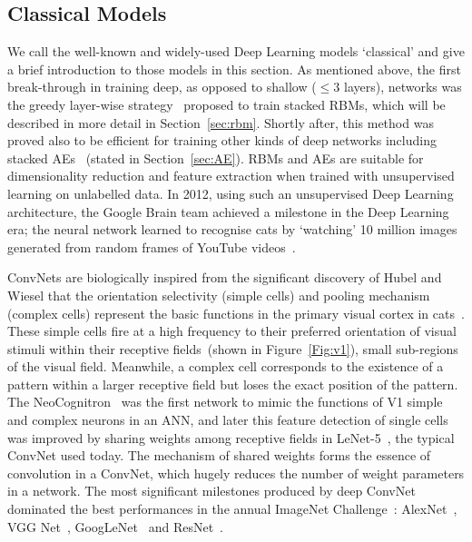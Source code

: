\subsection{Classical Models}
We call the well-known and widely-used Deep Learning models `classical' and give a brief introduction to those models in this section. 
As mentioned above, the first break-through in training deep, as opposed to shallow ($\le 3$ layers), networks was the greedy layer-wise strategy~\citep{hinton2006fast} proposed to train stacked RBMs, which will be described in more detail in Section~\ref{sec:rbm}.
Shortly after, this method was proved also to be efficient for training other kinds of deep networks including stacked AEs~\citep{bengio2007greedy} (stated in Section~\ref{sec:AE}).
RBMs and AEs are suitable for dimensionality reduction and feature extraction when trained with unsupervised learning on unlabelled data.
In 2012, using such an unsupervised Deep Learning architecture, the Google Brain team achieved a milestone in the Deep Learning era; the neural network learned to recognise cats by `watching' 10 million images generated from random frames of YouTube videos~\citep{le2013building}.

ConvNets are biologically inspired from the significant discovery of Hubel and Wiesel that the orientation selectivity (simple cells) and pooling mechanism (complex cells) represent the basic functions in the primary visual cortex in cats~\citep{hubel1962receptive}.
These simple cells fire at a high frequency to their preferred orientation of visual stimuli within their receptive fields~(shown in Figure~\ref{Fig:v1}), small sub-regions of the visual field.
Meanwhile, a complex cell corresponds to the existence of a pattern within a larger receptive field but loses the exact position of the pattern.
The NeoCognitron~\citep{fukushima1982neocognitron} was the first network to mimic the functions of V1 simple and complex neurons in an ANN, and later this feature detection of single cells was improved by sharing weights among receptive fields in LeNet-5~\citep{lecun1998gradient}, the typical ConvNet used today.
The mechanism of shared weights forms the essence of convolution in a ConvNet, which hugely reduces the number of weight parameters in a network.
The most significant milestones produced by deep ConvNet dominated the best performances in the annual ImageNet Challenge~\citep{russakovsky2015imagenet}: AlexNet~\citep{krizhevsky2012imagenet}, VGG Net~\citep{simonyan2014very}, GoogLeNet~\citep{szegedy2015going} and ResNet~\citep{he2016deep}.


